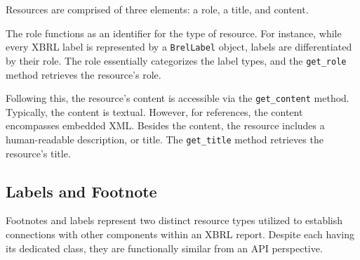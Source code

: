 Resources are comprised of three elements: a role, a title, and content.

The role functions as an identifier for the type of resource.
For instance, while every XBRL label is represented by a \texttt{BrelLabel} object,
labels are differentiated by their role.
The role essentially categorizes the label types,
and the \texttt{get\_role} method retrieves the resource's role.

Following this, the resource's content is accessible via the \texttt{get\_content} method.
Typically, the content is textual.
However, for references, the content encompasses embedded XML.
Besides the content, the resource includes a human-readable description, or title.
The \texttt{get\_title} method retrieves the resource's title.

\subsection{Labels and Footnote}

Footnotes and labels represent two distinct resource types utilized to establish connections with other components within an XBRL report.
Despite each having its dedicated class, they are functionally similar from an API perspective.

